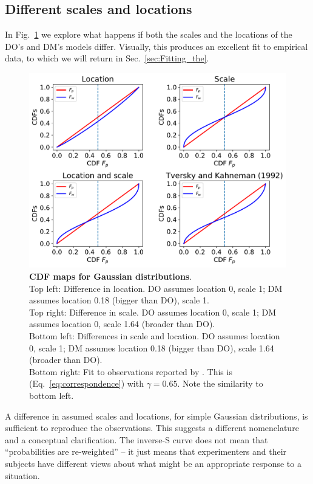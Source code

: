 \documentclass[a4paper, 12pt]{article}
\newcommand{\eref}[1]{(Eq.~\ref{eq:#1})}
\newcommand{\flabel}[1]{\label{fig:#1}}
\newcommand{\fref}[1]{Fig.~\ref{fig:#1}}
\newcommand{\seclabel}[1]{\label{sec:#1}}
\newcommand{\secref}[1]{Sec.~\ref{sec:#1}}
\begin{document}
\FloatBarrier
\subsection{Different scales and locations\seclabel{A_mismatch}}
In \fref{CDF_weights} we explore what happens if both the scales and the locations of the DO's and DM's models differ. Visually, this produces an excellent fit to empirical data, to which we will return in \secref{Fitting_the}.
 \begin{figure}
 \centering
 \includegraphics[width=1.0\textwidth]{./figs/Gauss_scale_location_both_KT.pdf}
 \caption{{\bf CDF maps for Gaussian distributions}.\\ 
 Top left: Difference in location. DO assumes location 0, scale 1; DM assumes location 0.18 (bigger than DO), scale 1.\\
 Top right: Difference in scale. DO assumes location 0, scale 1; DM assumes location 0, scale 1.64 (broader than DO).\\ 
 Bottom left: Differences in scale and location. DO assumes location 0, scale 1; DM assumes location 0.18 (bigger than DO), scale 1.64 (broader than DO).\\ 
 Bottom right: Fit to observations reported by \cite{TverskyKahneman1992}. This is \eref{correspondence} with $\gamma=0.65$.
Note the similarity to bottom left.}
 \flabel{CDF_weights}
 \end{figure}
 A difference in assumed scales and locations, for simple Gaussian distributions, is sufficient to reproduce the observations. This suggests a different nomenclature and a conceptual clarification. The inverse-S curve does not mean that ``probabilities are re-weighted'' -- it just means that experimenters and their subjects have different views about what might be an appropriate response to a situation. 
\end{document}
